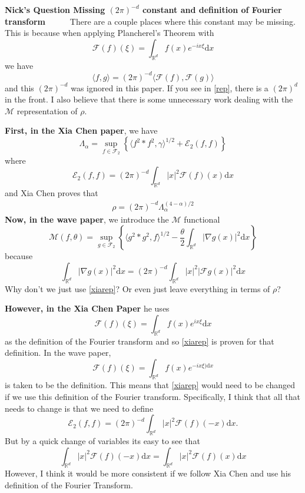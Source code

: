 \documentclass[a4paper,11pt]{article}
\numberwithin{equation}{section}
\theoremstyle{plain}
\theoremstyle{definition}
\newcommand{\ud}{\ensuremath{\mathrm{d} }}
\newcommand{\R}{\mathbb{R}}
\newcounter{NQ}
\newenvironment{NickQuestion}[1][] %
{\refstepcounter{NQ}
	\begin{mdframed}[backgroundcolor=lightgray]\textbf{Nick's Question \theNQ \: #1~~}~~~\noindent}%
	{\end{mdframed}}
\numberwithin{NQ}{section}
\numberwithin{LQ}{section}
\numberwithin{ZQ}{section}
\begin{document}
	\begin{NickQuestion}[Missing $(2 \pi)^{-d}$ constant and definition of Fourier transform]
		There are a couple places where this constant may be missing. This is because when applying Plancherel's Theorem with
		\[
		\mathcal{F}(f)(\xi) = \int_{\R^d} f(x) e^{-ix\xi}\ud x
		\]
		we have
		\[
		\langle f,g \rangle = (2\pi)^{-d} \langle \mathcal{F}(f), \mathcal{F}(g) \rangle
		\]
		and this $(2 \pi)^{-d}$ was ignored in this paper. If you see in \ref{rep}, there is a $(2 \pi)^d$ in the front. I also believe that there is some unnecessary work dealing with the  $\mathcal{M}$ representation of $\rho$.

		\textbf{First, in the Xia Chen paper}, we have
		\[
		\Lambda_{\alpha} = \sup_{f\in\mathcal{F}_2} \left\{ \langle  f^2 * f^2, \gamma \rangle^{1/2} + \mathcal{E}_2(f,f) \right\}
		\]
		where
		\[
		\mathcal{E}_2(f,f) = (2\pi)^{-d} \int_{\R^d} |x|^2 \mathcal{F}(f)(x) \ud x
		\]
		and Xia Chen proves that
		\begin{align}
		\rho = (2\pi)^{-d} \Lambda_{\alpha}^{(4-\alpha)/2} \label{xiarep}
		\end{align}
		\textbf{Now, in the wave paper}, we introduce the $\mathcal{M}$ functional
		\[
		\mathcal{M}(f,\theta) = \sup_{g \in \mathcal{F}_2} \left\{ \langle g^2*g^2,f\rangle^{1/2} - \frac{\theta}{2}\int_{\R^d} |\nabla g(x)|^2 \ud x \right\}
		\]
		because
		\[
		\int_{\R^d} |\nabla g(x)|^2 \ud x = (2\pi)^{-d} \int_{\R^d} |x|^2 |\mathcal{F} g(x)|^2 \ud x
		\]
		Why don't we just use \ref{xiarep}? Or even just leave everything in terms of $\rho$?

		\textbf{However, in the Xia Chen Paper} he uses
		\[
		\mathcal{F}(f)(\xi) = \int_{\R^d} f(x) e^{ix\xi} \ud x
		\]
		as the definition of the Fourier transform and so \ref{xiarep} is proven for that definition. In the wave paper,
		\[
		\mathcal{F}(f)(\xi) = \int_{\R^d} f(x) e^{-ix\xi) \ud x}
		\]
		is taken to be the definition. This means that \ref{xiarep} would need to be changed if we use this definition of the Fourier transform. Specifically, I think that all that needs to change is that we need to define
		\[
		\mathcal{E}_2(f,f) = (2\pi)^{-d} \int_{\R^d} |x|^2 \mathcal{F}(f)(-x) \ud x.
		\]
		But by a quick change of variables its easy to see that
		\[
		\int_{\R^d} |x|^2 \mathcal{F}(f)(-x) \ud x = \int_{\R^d} |x|^2 \mathcal{F}(f)(x) \ud x
		\]
		However, I think it would be more consistent  if we follow Xia Chen and use his definition of the Fourier Transform.
	\end{NickQuestion}
\end{document}
